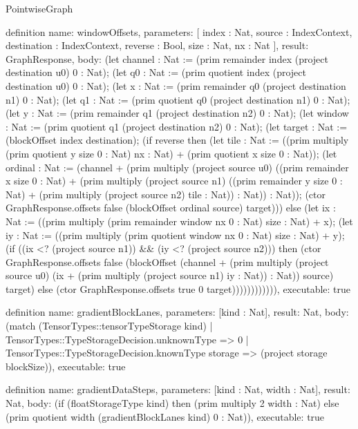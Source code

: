 \begin{lexlean}{PointwiseGraph}
\begin{semanticmodule}
definition{
  name: windowOffsets,
  parameters: [
    index : Nat,
    source : IndexContext,
    destination : IndexContext,
    reverse : Bool,
    size : Nat,
    nx : Nat
  ],
  result: GraphResponse,
  body: (let channel : Nat := (prim remainder index (project destination u0) 0 : Nat); (let q0 : Nat := (prim quotient index (project destination u0) 0 : Nat); (let x : Nat := (prim remainder q0 (project destination n1) 0 : Nat); (let q1 : Nat := (prim quotient q0 (project destination n1) 0 : Nat); (let y : Nat := (prim remainder q1 (project destination n2) 0 : Nat); (let window : Nat := (prim quotient q1 (project destination n2) 0 : Nat); (let target : Nat := (blockOffset index destination); (if reverse then (let tile : Nat := ((prim multiply (prim quotient y size 0 : Nat) nx : Nat) + (prim quotient x size 0 : Nat)); (let ordinal : Nat := (channel + (prim multiply (project source u0) ((prim remainder x size 0 : Nat) + (prim multiply (project source n1) ((prim remainder y size 0 : Nat) + (prim multiply (project source n2) tile : Nat)) : Nat)) : Nat)); (ctor GraphResponse.offsets false (blockOffset ordinal source) target))) else (let ix : Nat := ((prim multiply (prim remainder window nx 0 : Nat) size : Nat) + x); (let iy : Nat := ((prim multiply (prim quotient window nx 0 : Nat) size : Nat) + y); (if ((ix <? (project source n1)) && (iy <? (project source n2))) then (ctor GraphResponse.offsets false (blockOffset (channel + (prim multiply (project source u0) (ix + (prim multiply (project source n1) iy : Nat)) : Nat)) source) target) else (ctor GraphResponse.offsets true 0 target)))))))))))),
  executable: true
}

definition{
  name: gradientBlockLanes,
  parameters: [kind : Nat],
  result: Nat,
  body: (match (TensorTypes::tensorTypeStorage kind)
    | TensorTypes::TypeStorageDecision.unknownType => 0
    | TensorTypes::TypeStorageDecision.knownType storage => (project storage blockSize)),
  executable: true
}

definition{
  name: gradientDataSteps,
  parameters: [kind : Nat, width : Nat],
  result: Nat,
  body: (if (floatStorageType kind) then (prim multiply 2 width : Nat) else (prim quotient width (gradientBlockLanes kind) 0 : Nat)),
  executable: true
}


\end{semanticmodule}
\end{lexlean}
